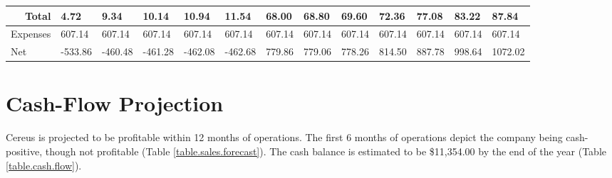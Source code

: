 \begin{table}[H]
\begin{tabularx}{\textwidth}{X X X X X X X X X X X X X}
    \multicolumn{1}{r}{Total} & 4.72 & 9.34 & 10.14 & 10.94 & 11.54 & 68.00 & 68.80 & 69.60 & 72.36 & 77.08 & 83.22 & 87.84  \\

    \hline

    \multicolumn{1}{l}{Expenses} & 607.14 & 607.14 & 607.14 & 607.14 & 607.14 & 607.14 & 607.14 & 607.14 & 607.14 & 607.14 & 607.14 & 607.14  \\

    \multicolumn{1}{l}{Net} & -533.86 & -460.48 & -461.28 & -462.08 & -462.68 & 779.86 & 779.06 & 778.26 & 814.50 & 887.78 & 998.64 & 1072.02  \\

  \end{tabularx}
  \label{table.profit.loss}
\end{table}


\section{Cash-Flow Projection}

Cereus is projected to be profitable within 12 months of operations. The first 6 months of operations depict the company being cash-positive, though not profitable (Table \ref{table.sales.forecast}). The cash balance is estimated to be \$11,354.00 by the end of the year (Table \ref{table.cash.flow}). 

